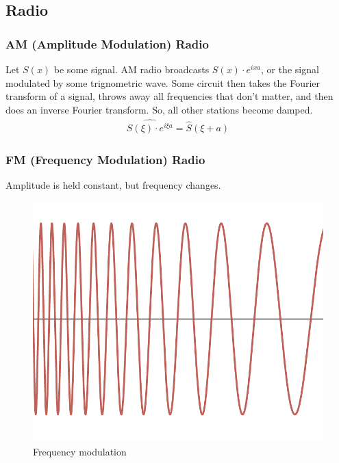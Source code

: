 \subsection{Radio}
\subsubsection{AM (Amplitude Modulation) Radio}
Let $S(x)$ be some signal. AM radio broadcasts $S(x) \cdot e^{ixa}$, or the signal modulated by some trignometric wave. Some circuit then takes the Fourier transform of a signal, throws away all frequencies that don't matter, and then does an inverse Fourier transform. So, all other stations become damped.
\begin{align}
    \widehat{S(\xi) \cdot e^{i\xi a}} = \hat{S}(\xi + a)
\end{align}

\subsubsection{FM (Frequency Modulation) Radio}
Amplitude is held constant, but frequency changes.
\begin{figure}[H]
    \centering
    \includegraphics[width=0.45\linewidth]{image2.png}
    \caption{Frequency modulation}
\end{figure}

